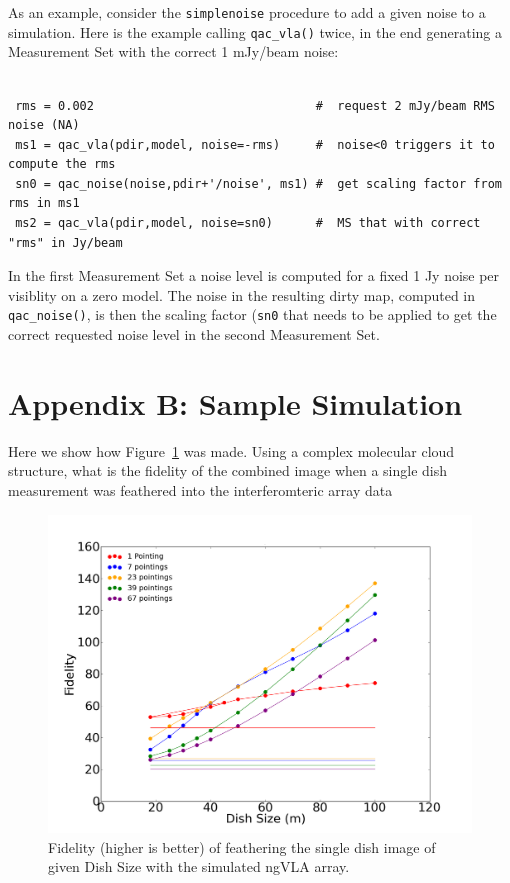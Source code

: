 \documentclass[11pt,twoside]{article}
\begin{document}
As an example, consider the {\tt simplenoise} procedure to add a given noise to a simulation.
Here is the example calling {\tt qac\_vla()} twice, in the end generating a Measurement Set with
the correct 1 mJy/beam noise:

\footnotesize
\begin{verbatim}

 rms = 0.002                               #  request 2 mJy/beam RMS noise (NA)
 ms1 = qac_vla(pdir,model, noise=-rms)     #  noise<0 triggers it to compute the rms
 sn0 = qac_noise(noise,pdir+'/noise', ms1) #  get scaling factor from rms in ms1
 ms2 = qac_vla(pdir,model, noise=sn0)      #  MS that with correct "rms" in Jy/beam
\end{verbatim}
\normalsize

In the first Measurement Set a noise level is computed for a fixed 1 Jy noise per visiblity on a
zero model. The noise in the resulting dirty map, computed in {\tt qac\_noise()}, is then the scaling factor ({\tt sn0}
that needs to be applied to get the correct requested noise level in the second Measurement Set.





\newpage
\section*{Appendix B: Sample Simulation}

Here we show how Figure~\ref{fig:fidelity} was made. Using a complex molecular cloud structure,
what is the fidelity of the combined image when a single dish measurement was feathered into
the interferomteric array data





\begin{figure}[h!]
\centering
\includegraphics[width=0.8\columnwidth]{fidelity1.png}
\caption{Fidelity (higher is better) of feathering the single dish image of given
  Dish Size with the simulated ngVLA array.
  }
\label{fig:fidelity}
\end{figure}
\end{document}
